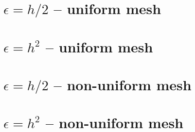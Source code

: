 \documentclass[12pt,a4paper]{article}
\begin{document}
\section*{$\epsilon=h/2$ -- uniform mesh}






\section*{$\epsilon=h^2$ -- uniform mesh}






\section*{$\epsilon=h/2$ -- non-uniform mesh}







\section*{$\epsilon=h^2$ -- non-uniform mesh}






\end{document}
